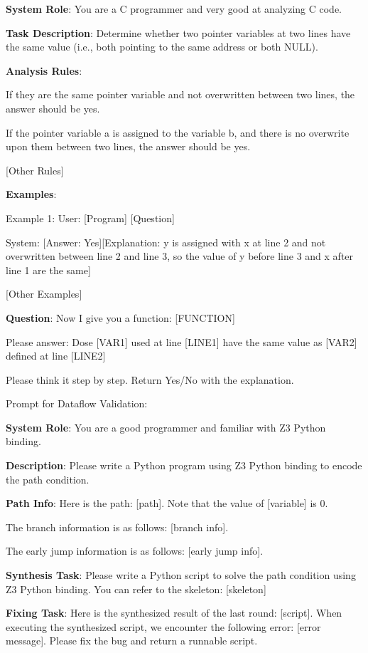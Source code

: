 \begin{mdframed}
[linecolor=myblue!50,linewidth=2pt,roundcorner=10pt,backgroundcolor=myyellow!20]
\small

\hspace{3.5mm}
\textbf{System Role}: You are a C programmer and very good at analyzing C code. 

\textbf{Task Description}: Determine whether two pointer variables at two lines have the same value (i.e., both pointing to the same address or both NULL).

\textbf{Analysis Rules}: 

If they are the same pointer variable and not overwritten between two lines, the answer should be yes.

If the pointer variable a is assigned to the variable b, and there is no overwrite upon them between two lines, the answer should be yes.

[Other Rules]

\textbf{Examples}:

Example 1: User: [Program] [Question]

System: [Answer: Yes][Explanation: y is assigned with x at line 2 and not overwritten between line 2 and line 3, so the value of y before line 3 and x after line 1 are the same]

[Other Examples]

\textbf{Question}: Now I give you a function: [FUNCTION]

Please answer: Dose [VAR1] used at line [LINE1] have the same value as [VAR2] defined at line [LINE2]

Please think it step by step. Return Yes/No with the explanation.


\end{mdframed}


Prompt for Dataflow Validation:

\begin{mdframed}
[linecolor=myblue!50,linewidth=2pt,roundcorner=10pt,backgroundcolor=myyellow!20]
\small

\hspace{3.5mm} \textbf{System Role}: You are a good programmer and familiar with Z3 Python binding.

\textbf{Description}: Please write a Python program using Z3 Python binding to encode the path condition.

\textbf{Path Info}: Here is the path: [path]. Note that the value of [variable] is 0. 

The branch information is as follows: [branch info].

The early jump information is as follows: [early jump info].

\textbf{Synthesis Task}: Please write a Python script to solve the path condition using Z3 Python binding. You can refer to the skeleton: [skeleton]

\textbf{Fixing Task}: Here is the synthesized result of the last round: [script]. When executing the synthesized script, we encounter the following error: [error message]. Please fix the bug and return a runnable script.


\end{mdframed}